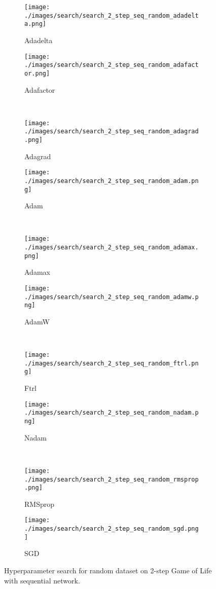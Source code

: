 \documentclass[letterpaper]{article} %
\begin{document}
\clearpage
\begin{figure*}[ht!]
    \centering
    \begin{subfigure}{.49\linewidth}
        \texttt{[image: ./images/search/search\_2\_step\_seq\_random\_adadelta.png]}
        \caption{Adadelta}
    \end{subfigure}
    \begin{subfigure}{.49\linewidth}
        \texttt{[image: ./images/search/search\_2\_step\_seq\_random\_adafactor.png]}
        \caption{Adafactor}
    \end{subfigure}
    \\
    \begin{subfigure}{.49\linewidth}
        \texttt{[image: ./images/search/search\_2\_step\_seq\_random\_adagrad.png]}
        \caption{Adagrad}
    \end{subfigure}
    \begin{subfigure}{.49\linewidth}
        \texttt{[image: ./images/search/search\_2\_step\_seq\_random\_adam.png]}
        \caption{Adam}
    \end{subfigure}
    \\
    \begin{subfigure}{.49\linewidth}
        \texttt{[image: ./images/search/search\_2\_step\_seq\_random\_adamax.png]}
        \caption{Adamax}
    \end{subfigure}
    \begin{subfigure}{.49\linewidth}
        \texttt{[image: ./images/search/search\_2\_step\_seq\_random\_adamw.png]}
        \caption{AdamW}
    \end{subfigure}
    \\
    \begin{subfigure}{.49\linewidth}
        \texttt{[image: ./images/search/search\_2\_step\_seq\_random\_ftrl.png]}
        \caption{Ftrl}
    \end{subfigure}
    \begin{subfigure}{.49\linewidth}
        \texttt{[image: ./images/search/search\_2\_step\_seq\_random\_nadam.png]}
        \caption{Nadam}
    \end{subfigure}
    \\
    \begin{subfigure}{.49\linewidth}
        \texttt{[image: ./images/search/search\_2\_step\_seq\_random\_rmsprop.png]}
        \caption{RMSprop}
    \end{subfigure}
    \begin{subfigure}{.49\linewidth}
        \texttt{[image: ./images/search/search\_2\_step\_seq\_random\_sgd.png]}
        \caption{SGD}
    \end{subfigure}
    \caption{Hyperparameter search for random dataset on 2-step Game of Life with sequential network.}
    \label{fig:search_2_seq_random}
\end{figure*}
\end{document}
